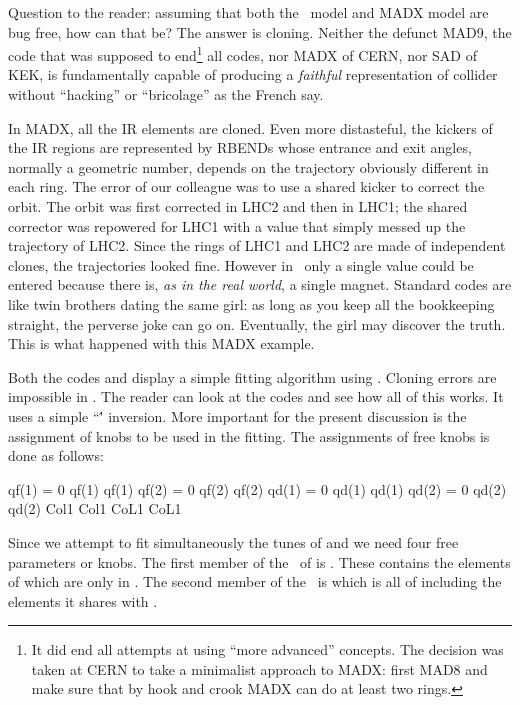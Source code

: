 Question to the reader: assuming that both the \PTC\ model and MADX model are bug free, how can that be? The answer is cloning. Neither the defunct MAD9, the code that was supposed to end\footnote{It did end all attempts at using ``more advanced'' concepts. The decision was taken at CERN to take a minimalist approach to MADX: first MAD8 and make sure that by hook and crook MADX can do at least two rings.} all codes, nor MADX of CERN, nor SAD of KEK, is fundamentally capable of producing a \emph{faithful} representation of collider without ``hacking'' or ``bricolage'' as the French say.

In MADX, all the IR elements are cloned. Even more distasteful, the kickers of the IR regions are represented by RBENDs whose entrance and exit angles, normally a geometric number, depends on the trajectory obviously different in each ring. The error of our colleague was to use a shared kicker to correct the orbit. The orbit was first corrected in LHC2 and then in LHC1; the shared corrector was repowered for LHC1 with a value that simply messed up the trajectory of LHC2.  Since the rings of LHC1 and LHC2 are made of independent clones, the trajectories looked fine. However in \PTC\ only a single value could be entered because there is, \emph{ as in the real world}, a single magnet. Standard codes are like twin brothers  dating the same girl: as long as you keep all the bookkeeping straight, the perverse joke can go on. Eventually, the girl  may discover the truth. This is what happened with this MADX example. 


Both the codes  and  display a simple fitting algorithm using \TPSA . Cloning errors are impossible in \PTC .
The reader can look at the codes and see how all of this  works. It uses a simple ``\TPSA\'' inversion. More important for the present discussion is the assignment of knobs to be used in the fitting. The assignments of free knobs is done as follows:


\begin{ptccode}
qf(1) = 0
qf(1)%
qf(1)%
qf(2) = 0
qf(2)%
qf(2)%
qd(1) = 0
qd(1)%
qd(1)%
qd(2) = 0
qd(2)%
qd(2)%
Col1%
Col1%
CoL1%
CoL1%
\end{ptccode}

Since we attempt to fit simultaneously the tunes of  and  we need four free parameters or knobs. The first member of the \DNA\ of  is . These contains the elements of   which are only in . The second member of the \DNA\ is  which is all of  including the elements it shares with . 

